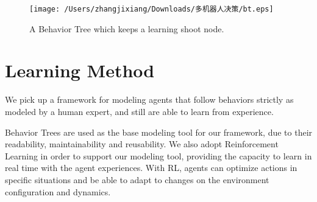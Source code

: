 \documentclass[a4paper,12pt]{article}
\begin{document}
\begin{figure}[tbph!]
	\centering
	\texttt{[image: /Users/zhangjixiang/Downloads/多机器人决策/bt.eps]}
	\caption{A Behavior Tree which keeps a learning shoot node.}
	\label{fig:bt}
\end{figure}



\section{Learning Method}

We pick up a framework for modeling agents that follow behaviors strictly as modeled by a human expert, and still are able to learn from experience.

Behavior Trees are used as the base modeling tool for our framework, due to their readability, maintainability and reusability. We also adopt Reinforcement Learning in order to support our modeling tool, providing the capacity to learn in real time with the agent experiences. With RL, agents can optimize actions in specific situations and be able to adapt to changes on the environment configuration and dynamics.
\end{document}
